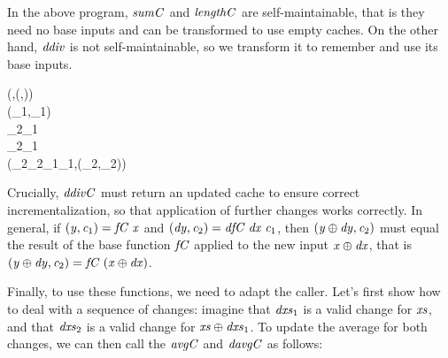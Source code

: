 In the above program, \ensuremath{\Varid{sumC}} and \ensuremath{\Varid{lengthC}} are self-maintainable, that is they
need no base inputs and can be transformed to use empty caches. On the other
hand, \ensuremath{\Varid{ddiv}} is not self-maintainable, so we transform it to remember and use
its base inputs.
\begin{hscode}\SaveRestoreHook
{}%
%
%
%
%
\>[B]{}\;\;\mathrel{=}(,(,)){}\<[E]%
\\
\>[B]{}\;\;\;(_{1},_{1})\mathrel{=}{}\<[E]%
\\
\>[B]{}\<[3]%
\>[3]{}\;{}\<[8]%
\>[8]{}_{2}{}\<[12]%
\>[12]{}\mathrel{=}_{1}\oplus {}\<[E]%
\\
\>[8]{}_{2}{}\<[12]%
\>[12]{}\mathrel{=}_{1}\oplus {}\<[E]%
\\
\>[B]{}\<[3]%
\>[3]{}\;{}\<[8]%
\>[8]{}(\;_{2}\;_{2}\ominus {}\;_{1}\;_{1},(_{2},_{2})){}\<[E]%
\ColumnHook
\end{hscode}\resethooks
Crucially, \ensuremath{\Varid{ddivC}} must return an updated cache to ensure correct
incrementalization, so that application of further changes works correctly. In
general, if \ensuremath{(\Varid{y},\Varid{c}_{1})\mathrel{=}\Varid{fC}\;\Varid{x}} and \ensuremath{(\Varid{dy},\Varid{c}_{2})\mathrel{=}\Varid{dfC}\;\Varid{dx}\;\Varid{c}_{1}}, then \ensuremath{(\Varid{y}\oplus \Varid{dy},\Varid{c}_{2})} must equal the result of the base function \ensuremath{\Varid{fC}} applied to the new input \ensuremath{\Varid{x}\oplus \Varid{dx}}, that is \ensuremath{(\Varid{y}\oplus \Varid{dy},\Varid{c}_{2})\mathrel{=}\Varid{fC}\;(\Varid{x}\oplus \Varid{dx})}.

Finally, to use these functions, we need to adapt the caller. Let's first show
how to deal with a sequence of changes: imagine that \ensuremath{\Varid{dxs}_{1}} is a valid change
for \ensuremath{\Varid{xs}}, and that \ensuremath{\Varid{dxs}_{2}} is a valid change for \ensuremath{\Varid{xs}\oplus \Varid{dxs}_{1}}. To update the
average for both changes, we can then call the \ensuremath{\Varid{avgC}} and \ensuremath{\Varid{davgC}} as follows:

